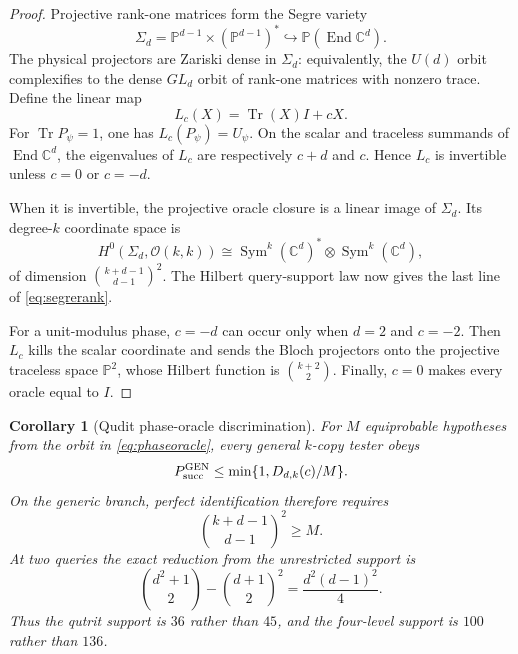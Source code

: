 \documentclass[11pt]{article}
\newtheorem{corollary}[theorem]{Corollary}
\theoremstyle{definition}
\theoremstyle{remark}
\newcommand{\C}{\mathbb C}
\newcommand{\PP}{\mathbb P}
\newcommand{\Tr}{\operatorname{Tr}}
\newcommand{\Sym}{\operatorname{Sym}}
\begin{document}
\begin{proof}
Projective rank-one matrices form the Segre variety
\begin{equation}
 \Sigma_d=\PP^{d-1}\times(\PP^{d-1})^*\hookrightarrow\PP(\operatorname{End}\C^d).
\end{equation}
The physical projectors are Zariski dense in $\Sigma_d$: equivalently, the
$U(d)$ orbit complexifies to the dense $GL_d$ orbit of rank-one matrices with
nonzero trace.  Define the linear map
\begin{equation}
 L_c(X)=\Tr(X)I+cX.
\end{equation}
For $\Tr P_\psi=1$, one has $L_c(P_\psi)=U_\psi$.  On the scalar and traceless
summands of $\operatorname{End}\C^d$, the eigenvalues of $L_c$ are respectively
$c+d$ and $c$.  Hence $L_c$ is invertible unless $c=0$ or $c=-d$.

When it is invertible, the projective oracle closure is a linear image of
$\Sigma_d$.  Its degree-$k$ coordinate space is
\begin{equation}
 H^0(\Sigma_d,\mathcal O(k,k))
 \cong \Sym^k(\C^d)^*\otimes\Sym^k(\C^d),
\end{equation}
of dimension $\binom{k+d-1}{d-1}^2$.  The Hilbert query-support law now gives
the last line of \cref{eq:segrerank}.

For a unit-modulus phase, $c=-d$ can occur only when $d=2$ and $c=-2$.
Then $L_c$ kills the scalar coordinate and sends the Bloch projectors onto
the projective traceless space $\PP^2$, whose Hilbert function is
$\binom{k+2}{2}$.  Finally, $c=0$ makes every oracle equal to $I$.
\end{proof}

\begin{corollary}[Qudit phase-oracle discrimination]\label{cor:segregen}
For $M$ equiprobable hypotheses from the orbit in \cref{eq:phaseoracle}, every
general $k$-copy tester obeys
\begin{equation}
 P_{\rm succ}^{\rm GEN}\leq\min\{1,D_{d,k}(c)/M\}.
\end{equation}
On the generic branch, perfect identification therefore requires
\begin{equation}
 \binom{k+d-1}{d-1}^{\!2}\geq M.
\end{equation}
At two queries the exact reduction from the unrestricted support is
\begin{equation}\label{eq:quditdefect}
 \binom{d^2+1}{2}-\binom{d+1}{2}^{\!2}
 =\frac{d^2(d-1)^2}{4}.
\end{equation}
Thus the qutrit support is $36$ rather than $45$, and the four-level support
is $100$ rather than $136$.
\end{corollary}
\end{document}
